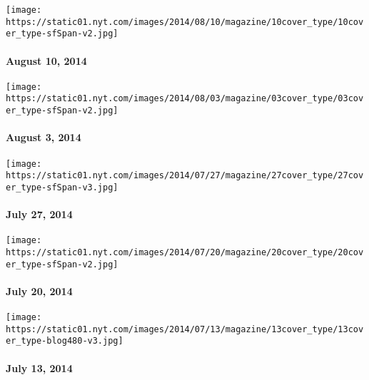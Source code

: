 \href{http://www.nytimes.com/indexes/2014/08/10/magazine/index.html}{}

\texttt{[image: https://static01.nyt.com/images/2014/08/10/magazine/10cover\_type/10cover\_type-sfSpan-v2.jpg]}

\hypertarget{august-10-2014}{%
\paragraph{August 10, 2014}\label{august-10-2014}}

\href{http://www.nytimes.com/indexes/2014/08/03/magazine/index.html}{}

\texttt{[image: https://static01.nyt.com/images/2014/08/03/magazine/03cover\_type/03cover\_type-sfSpan-v2.jpg]}

\hypertarget{august-3-2014}{%
\paragraph{August 3, 2014}\label{august-3-2014}}

\href{http://www.nytimes.com/indexes/2014/07/27/magazine/index.html}{}

\texttt{[image: https://static01.nyt.com/images/2014/07/27/magazine/27cover\_type/27cover\_type-sfSpan-v3.jpg]}

\hypertarget{july-27-2014}{%
\paragraph{July 27, 2014}\label{july-27-2014}}

\href{http://www.nytimes.com/indexes/2014/07/20/magazine/index.html}{}

\texttt{[image: https://static01.nyt.com/images/2014/07/20/magazine/20cover\_type/20cover\_type-sfSpan-v2.jpg]}

\hypertarget{july-20-2014}{%
\paragraph{July 20, 2014}\label{july-20-2014}}

\href{http://www.nytimes.com/indexes/2014/07/13/magazine/index.html}{}

\texttt{[image: https://static01.nyt.com/images/2014/07/13/magazine/13cover\_type/13cover\_type-blog480-v3.jpg]}

\hypertarget{july-13-2014}{%
\paragraph{July 13, 2014}\label{july-13-2014}}


